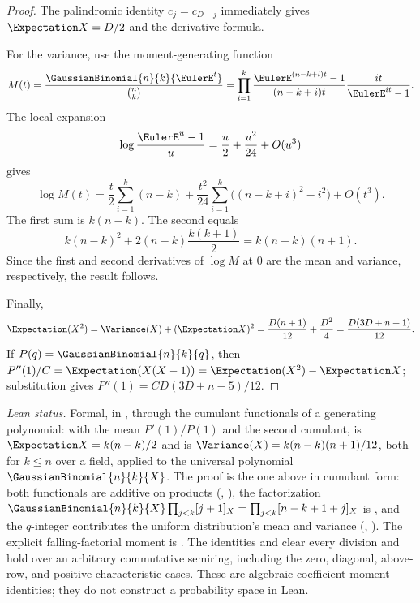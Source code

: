 \documentclass[11pt,a4paper,oneside,openany]{book}
\theoremstyle{definition}
\theoremstyle{remark}
\begin{document}
\begin{proof}
The palindromic identity $c_j=c_{D-j}$ immediately gives $\Expectation X=D/2$ and the derivative formula.

For the variance, use the moment-generating function
\[
 M(t)=\frac{\GaussianBinomial{n}{k}{\EulerE^t}}{\binom nk}
 =\prod_{i=1}^{k}
 \frac{\EulerE^{(n-k+i)t}-1}{(n-k+i)t}
 \frac{it}{\EulerE^{it}-1}.
\]
The local expansion
\[
 \log\frac{\EulerE^{u}-1}{u}=\frac u2+\frac{u^2}{24}+O(u^3)
\]
gives
\[
 \log M(t)
 =\frac t2\sum_{i=1}^k(n-k)
 +\frac{t^2}{24}\sum_{i=1}^k\bigl((n-k+i)^2-i^2\bigr)+O(t^3).
\]
The first sum is $k(n-k)$.  The second equals
\[
 k(n-k)^2+2(n-k)\frac{k(k+1)}2
 =k(n-k)(n+1).
\]
Since the first and second derivatives of $\log M$ at $0$ are the mean and variance, respectively, the result follows.

Finally,
\[
 \Expectation(X^2)=\Variance(X)+(\Expectation X)^2
 =\frac{D(n+1)}{12}+\frac{D^2}{4}
 =\frac{D(3D+n+1)}{12}.
\]
If $P(q)=\GaussianBinomial{n}{k}{q}$, then
$P''(1)/C=\Expectation(X(X-1))=\Expectation(X^2)-\Expectation X$;
substitution gives $P''(1)=CD(3D+n-5)/12$.
\end{proof}

\emph{Lean status.}  Formal, in , through the cumulant
functionals of a generating polynomial: with  the mean $P'(1)/P(1)$ and
 the second cumulant,
 is $\Expectation X=k(n-k)/2$ and
 is $\Variance(X)=k(n-k)(n+1)/12$, both for $k\le n$
over a field, applied to the universal polynomial $\GaussianBinomial{n}{k}{X}$.  The proof is the
one above in cumulant form: both functionals are additive on products
(, ), the factorization
$\GaussianBinomial{n}{k}{X}\prod_{j<k}[j+1]_X=\prod_{j<k}[n-k+1+j]_X$ is
, and the $q$-integer contributes the uniform
distribution's mean and variance (,
).  The explicit falling-factorial moment is
.  The identities
 and
 clear every division and
hold over an arbitrary commutative semiring, including the zero, diagonal, above-row, and
positive-characteristic cases.  These are algebraic coefficient-moment identities; they do not
construct a probability space in Lean.
\end{document}
